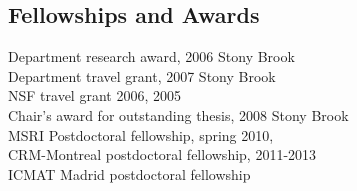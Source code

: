 \documentclass[overlapped,line,letterpaper]{res}
\begin{document}
\begin{resume}
\section{\sc Fellowships and Awards}
Department research award, 2006 Stony Brook\\
Department travel grant, 2007 Stony Brook\\
NSF travel grant 2006, 2005 \\
Chair's award for outstanding thesis, 2008 Stony Brook\\
MSRI Postdoctoral fellowship, spring 2010,\\
CRM-Montreal postdoctoral fellowship,  2011-2013\\ ICMAT Madrid
postdoctoral fellowship

\end{resume}
\end{document}
